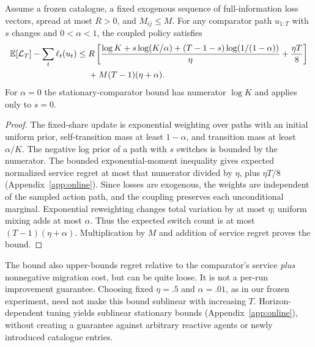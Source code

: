 \begin{theorem}\label{thm:tracking}
Assume a frozen catalogue, a fixed exogenous sequence of full-information loss vectors, spread at most $R>0$, and $M_{ij}\le M$. For any comparator path $u_{1:T}$ with $s$ changes and $0<\alpha<1$, the coupled policy satisfies
\begin{align}
 \mathbb E[\mathcal L_T]-\sum_t\ell_t(u_t)
 \le{}& R\left[\frac{\log K+s\log(K/\alpha)+(T-1-s)\log(1/(1-\alpha))}{\eta}
             +\frac{\eta T}{8}\right]\nonumber\\
 &+M(T-1)(\eta+\alpha).\label{eq:tracking}
\end{align}
For $\alpha=0$ the stationary-comparator bound has numerator $\log K$ and applies only to $s=0$.
\end{theorem}
\begin{proof}
The fixed-share update is exponential weighting over paths with an initial uniform prior, self-transition mass at least $1-\alpha$, and transition mass at least $\alpha/K$. The negative log prior of a path with $s$ switches is bounded by the numerator. The bounded exponential-moment inequality gives expected normalized service regret at most that numerator divided by $\eta$, plus $\eta T/8$ (Appendix~\ref{app:online}). Since losses are exogenous, the weights are independent of the sampled action path, and the coupling preserves each unconditional marginal. Exponential reweighting changes total variation by at most $\eta$; uniform mixing adds at most $\alpha$. Thus the expected switch count is at most $(T-1)(\eta+\alpha)$. Multiplication by $M$ and addition of service regret proves the bound.\end{proof}
The bound also upper-bounds regret relative to the comparator's service \emph{plus} nonnegative migration cost, but can be quite loose. It is not a per-run improvement guarantee. Choosing fixed $\eta=.5$ and $\alpha=.01$, as in our frozen experiment, need not make this bound sublinear with increasing $T$. Horizon-dependent tuning yields sublinear stationary bounds (Appendix~\ref{app:online}), without creating a guarantee against arbitrary reactive agents or newly introduced catalogue entries.

